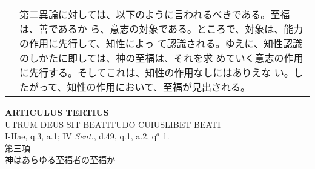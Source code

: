 \documentclass[10pt]{jsarticle} %
\begin{document}
\begin{longtable}{p{21em}p{21em}}
&


第二異論に対しては、以下のように言われるべきである。至福は、善であるか
ら、意志の対象である。ところで、対象は、能力の作用に先行して、知性によっ
て認識される。ゆえに、知性認識のしかたに即しては、神の至福は、それを求
めていく意志の作用に先行する。そしてこれは、知性の作用なしにはありえな
い。したがって、知性の作用において、至福が見出される。



\end{longtable}



\newpage


\begin{center}
 {\Large {\bf ARTICULUS TERTIUS}}\\
 {\large UTRUM DEUS SIT BEATITUDO CUIUSLIBET BEATI}\\
 {\footnotesize I-IIae, q.3, a.1; IV {\itshape Sent.}, d.49, q.1, a.2,
 q$^a$ 1.}\\
 {\Large 第三項\\神はあらゆる至福者の至福か}
\end{center}
\end{document}
